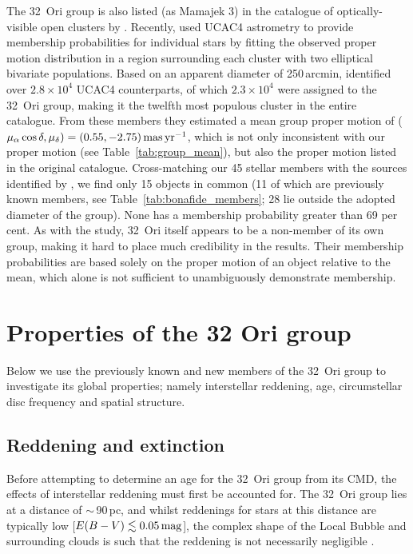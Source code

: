 \documentclass[usenatbib]{mnras}
\begin{document}
The 32~Ori group is also listed (as Mamajek 3) in the catalogue of
optically-visible open clusters by \citet[v.2.5;
  2005]{Dias02}. Recently, \cite{Dias14} used UCAC4 astrometry to
provide membership probabilities for individual stars by fitting the
observed proper motion distribution in a region surrounding each
cluster with two elliptical bivariate populations.  Based on an
apparent diameter of 250\,arcmin, \cite{Dias14} identified over
$2.8\times10^4$ UCAC4 counterparts, of which $2.3\times10^4$ were
assigned to the 32~Ori group, making it the twelfth most populous
cluster in the entire catalogue. From these members they estimated a
mean group proper motion of ($\mu_{\alpha}\cos\delta, \mu_{\delta}) =
(0.55, -2.75)\,\rm{mas\,yr^{-1}}$, which is not only inconsistent with
our proper motion (see Table~\ref{tab:group_mean}), but also the
proper motion listed in the original \cite{Dias02}
catalogue. Cross-matching our 45 stellar members with the sources
identified by \citeauthor{Dias14}, we find only 15 objects in common
(11 of which are previously known members, see
Table~\ref{tab:bonafide_members}; 28 lie outside the adopted diameter
of the group). None has a membership probability greater than 69 per
cent. As with the \cite{Kharchenko13} study, 32~Ori itself appears to
be a non-member of its own group, making it hard to place much
credibility in the \citeauthor{Dias14} results.  Their membership
probabilities are based solely on the proper motion of an object
relative to the mean, which alone is not sufficient to unambiguously
demonstrate membership.

\section{Properties of the 32 Ori group}
\label{properties_32_ori_group}

Below we use the previously known and new members of the 32~Ori group
to investigate its global properties; namely interstellar reddening,
age, circumstellar disc frequency and spatial structure.

\subsection{Reddening and extinction}
\label{reddening}

Before attempting to determine an age for the 32~Ori group from its
CMD, the effects of interstellar reddening must first be accounted
for. The 32~Ori group lies at a distance of $\sim$\,90\,pc, and whilst
reddenings for stars at this distance are typically low
[$E(B-V)\lesssim0.05\,\rm{mag}$], the complex shape of the Local
Bubble and surrounding clouds is such that the reddening is not
necessarily negligible \citep{Reis11}.
\end{document}
